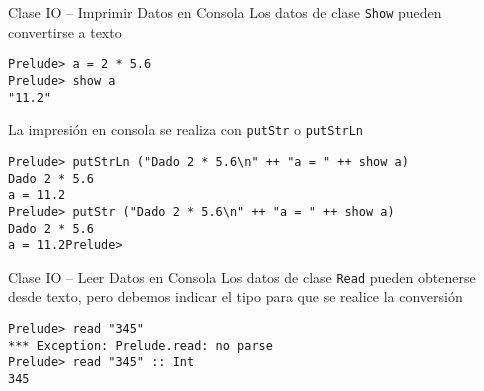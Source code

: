 \begin{frame}[fragile]{Clase IO -- Imprimir Datos en Consola}
    Los datos de clase \verb|Show| pueden convertirse a texto
    \begin{lstlisting}[style=consola]
Prelude> a = 2 * 5.6
Prelude> show a
"11.2"
    \end{lstlisting}
    La impresión en consola se realiza con  \verb|putStr| o \verb|putStrLn|
    \begin{lstlisting}[style=consola]
Prelude> putStrLn ("Dado 2 * 5.6\n" ++ "a = " ++ show a)
Dado 2 * 5.6
a = 11.2
Prelude> putStr ("Dado 2 * 5.6\n" ++ "a = " ++ show a)
Dado 2 * 5.6
a = 11.2Prelude>
    \end{lstlisting}    
\end{frame}

\begin{frame}[fragile]{Clase IO -- Leer Datos en Consola}
    Los datos de clase \verb|Read| pueden obtenerse desde texto,
    pero debemos indicar el tipo para que se realice la conversión
    \begin{lstlisting}[style=consola]
Prelude> read "345"
*** Exception: Prelude.read: no parse
Prelude> read "345" :: Int
345
    \end{lstlisting}
\end{frame}
